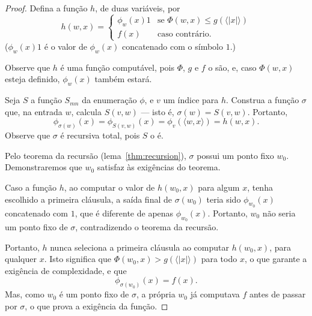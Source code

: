 \begin{proof}
    Defina a função $h$, de duas variáveis, por
    \begin{equation*}
        h(w, x) = \begin{cases}
            \phi_w(x)1 & \text{se $\Phi(w, x) \leq g(\langle|x|\rangle)$} \\
            f(x) & \text{caso contrário.}
        \end{cases}
    \end{equation*}
    ($\phi_w(x)1$ é o valor de $\phi_w(x)$ concatenado com o símbolo $1$.)

    Observe que $h$ é uma função computável,
    pois $\Phi$, $g$ e $f$ o são,
    e, caso $\Phi(w, x)$ esteja definido,
    $\phi_w(x)$ também estará.

    Seja $S$ a função $S_{mn}$ da enumeração $\phi$,
    e $v$ um índice para $h$.
    Construa a função $\sigma$ que,
    na entrada $w$, calcula $S(v, w)$
    --- isto é, $\sigma(w) = S(v, w)$.
    Portanto,
    \begin{equation*}
        \phi_{\sigma(w)}(x) = \phi_{S(v, w)}(x) = \phi_v(\langle w, x \rangle) = h(w, x).
    \end{equation*}
    Observe que $\sigma$ é recursiva total, pois $S$ o é.

    Pelo teorema da recursão (lema~\ref{thm:recursion}),
    $\sigma$ possui um ponto fixo $w_0$.
    Demonstraremos que $w_0$ satisfaz às exigências do teorema.

    Caso a função $h$, ao computar o valor de $h(w_0, x)$
    para algum $x$,
    tenha escolhido a primeira cláusula,
    a saída final de $\sigma(w_0)$ teria sido
    $\phi_{w_0} (x)$ concatenado com $1$,
    que é diferente de apenas $\phi_{w_0}(x)$.
    Portanto, $w_0$ não seria um ponto fixo de $\sigma$,
    contradizendo o teorema da recursão.

    Portanto, $h$ nunca seleciona a primeira cláusula
    ao computar $h(w_0, x)$, para qualquer $x$.
    Isto significa que $\Phi(w_0, x) > g(\langle |x| \rangle)$ para todo $x$,
    o que garante a exigência de complexidade,
    e que
    \begin{equation*}
        \phi_{\sigma(w_0)}(x) = f(x).
    \end{equation*}
    Mas, como $w_0$ é um ponto fixo de $\sigma$,
    a própria $w_0$ já computava $f$ antes de passar por $\sigma$,
    o que prova a exigência da função.
\end{proof}
